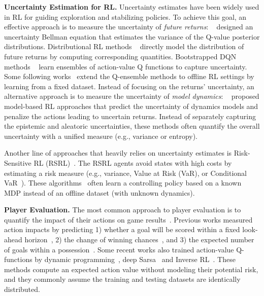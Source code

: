 \documentclass{article}
\begin{document}
\noindent\textbf{Uncertainty Estimation for RL.}
Uncertainty estimates have been widely used in RL for guiding exploration and stabilizing policies. To achieve this goal, an effective approach is to measure the uncertainty of {\it future returns}: ~\cite{ODonoghue2018UncertaintyBellman} designed an 
uncertainty Bellman equation that estimates the variance of the Q-value posterior distributions.
Distributional RL methods ~\cite{bellemare2017distributional,Dabney2018DistributionalRL,Mavrin2019DistributionalRL,Zhou2020NonCrossing,Zhou2021Quantile,Tang2018DistribExplore,Zhang2019QUOTA,luo2022distributional} directly model the distribution of future returns by computing corresponding quantities.  Bootstrapped DQN methods ~\cite{Osband2016DeepBootstrapped,Chen2017QEnsembles,Osband2018RandomizedPrior,Silva2020UncertaintyActionAdvise} learn ensembles of action-value Q functions to capture uncertainty. Some following works~\cite{Kumar2019Stable,An2021OfflineQEnsemble} extend the Q-ensemble methods to offline RL settings by learning from a fixed dataset. Instead of focusing on the returns' uncertainty, an alternative approach is to measure the uncertainty of {\it model dynamics}: ~\cite{Yu2020MOPO,Kidambi2020MOReL} proposed model-based RL approaches that predict the uncertainty of dynamics models and penalize the actions leading to uncertain returns. Instead of separately capturing the epistemic and aleatoric uncertainties, these methods often quantify the overall uncertainty with a unified measure (e.g., variance or entropy). 

Another line of approaches that heavily relies on uncertainty estimates is Risk-Sensitive RL (RSRL)~\cite{mihatsch2002risk}. The RSRL agents avoid states with high costs by estimating a risk measure (e.g., variance, Value at Risk (VaR), or Conditional VaR~\cite{rockafellar2000optimization}). These algorithms~\cite{Shen2014RSRL,Chow2015RSRobust} often learn a controlling policy based on a known MDP instead of an offline dataset (with unknown dynamics). 

\noindent\textbf{Player Evaluation.} 
The most common approach to player evaluation is to quantify the impact of their actions on game results~\cite{schwartz2017handbook}. Previous works measured action impacts by predicting 1) whether a goal will be scored within a fixed look-ahead horizon~\cite{Decroos2019Actions}, 2) the change of winning chances~\cite{Xenopoulos2020CounterStrike}, and 3) the expected number of goals within a possession~\cite{cervone2016multiresolution}.  
Some recent works also trained action-value Q-functions by dynamic programming~\cite{Routley2015Markov}, deep Sarsa~\cite{Liu2018DRL,Liu2020soccer} and Inverse RL~\cite{Luo2020IRL}. These methods compute an expected action value without modeling their potential risk, and they commonly assume the training and testing datasets are identically distributed. 
\end{document}

